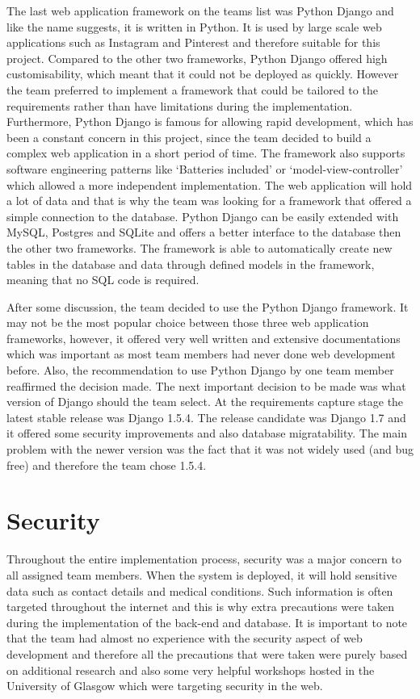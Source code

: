 \documentclass{l3proj}
\begin{document}
The last web application framework on the teams list was Python Django and like the name suggests, it is written in Python. It is used by large scale web applications such as Instagram and Pinterest and therefore suitable for this project. Compared to the other two frameworks, Python Django offered high customisability, which meant that it could not be deployed as quickly. However the team preferred to implement a framework that could be tailored to the requirements rather than have limitations during the implementation. Furthermore, Python Django is famous for allowing rapid development, which has been a constant concern in this project, since the team decided to build a complex web application in a short period of time. The framework also supports software engineering patterns like `Batteries included' or `model-view-controller' which allowed a more independent implementation. The web application will hold a lot of data and that is why the team was looking for a framework that offered a simple connection to the database. Python Django can be easily extended with MySQL, Postgres and SQLite and offers a better interface to the database then the other two frameworks. The framework is able to automatically create new tables in the database and data through defined models in the framework, meaning that no SQL code is required.\\
\par 
After some discussion, the team decided to use the Python Django framework. It may not be the most popular choice between those three web application frameworks, however, it offered very well written and extensive documentations which was important as most team members had never done web development before. Also, the recommendation to use Python Django by one team member reaffirmed the decision made. The next important decision to be made was what version of Django should the team select. At the requirements capture stage the latest stable release was Django 1.5.4. The release candidate was Django 1.7 and it offered some security improvements and also database migratability. The main problem with the newer version was the fact that it was not widely used (and bug free) and therefore the team chose 1.5.4. 

\section{Security}
Throughout the entire implementation process, security was a major concern to all assigned team members. When the system is deployed, it will hold sensitive data such as contact details and medical conditions. Such information is often targeted throughout the internet and this is why extra precautions were taken during the implementation of the back-end and database. It is important to note that the team had almost no experience with the security aspect of web development and therefore all the precautions that were taken were purely based on additional research and also some very helpful workshops hosted in the University of Glasgow which were targeting security in the web.\\
\end{document}
